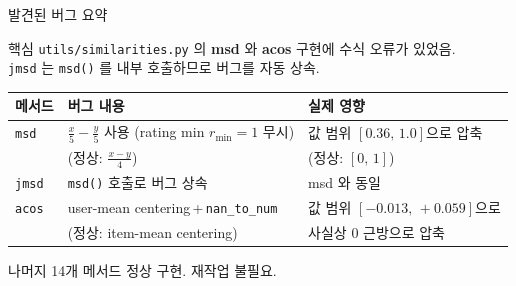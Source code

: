 \documentclass[aspectratio=169,10pt]{beamer}
\begin{document}
\begin{frame}{발견된 버그 요약}
	\begin{alertblock}{핵심}
		\texttt{utils/similarities.py} 의 \textbf{msd} 와 \textbf{acos} 구현에 수식 오류가 있었음.\\
		\texttt{jmsd} 는 \texttt{msd()} 를 내부 호출하므로 버그를 자동 상속.
	\end{alertblock}

	\vspace{0.5em}
	\renewcommand{\arraystretch}{1.4}
	\begin{tabular}{l|p{4.5cm}|p{4.7cm}}
		\toprule
		\textbf{메서드} & \textbf{버그 내용} & \textbf{실제 영향} \\
		\midrule
		\texttt{msd}
		  & $\displaystyle\frac{x}{5}-\frac{y}{5}$ 사용
		    \newline (rating min $r_{\min}=1$ 무시)
		  & 값 범위 $[0.36,\,1.0]$으로 압축\\
		  & (정상: $\displaystyle\frac{x-y}{4}$) & (정상: $[0,\,1]$) \\
		\midrule
		\texttt{jmsd}
		  & \texttt{msd()} 호출로 버그 상속
		  & msd 와 동일 \\
		\midrule
		\texttt{acos}
		  & user-mean centering\,+\,\texttt{nan\_to\_num}
		  & 값 범위 $[-0.013,\,+0.059]$으로 \\
		  & (정상: item-mean centering)  & 사실상 $0$ 근방으로 압축 \\
		\bottomrule
	\end{tabular}

	\vspace{0.4em}
	\begin{block}{나머지 14개 메서드}
		정상 구현. 재작업 불필요.
	\end{block}
\end{frame}
\end{document}
